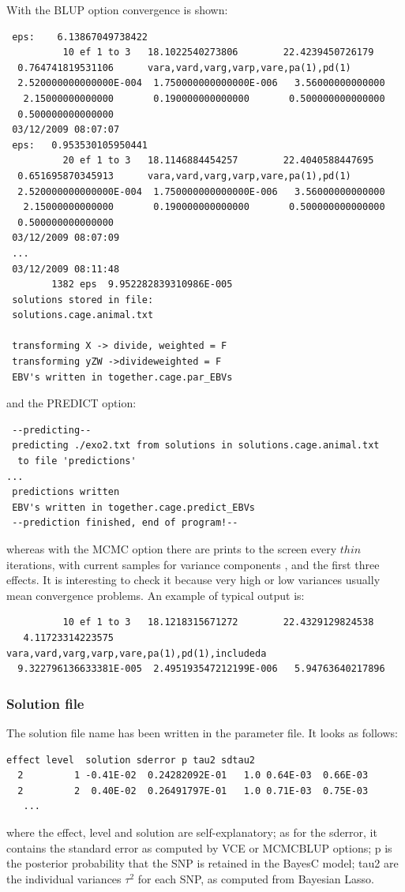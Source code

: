 \documentclass[a4paper,12pt,titlepage]{article}      %
\begin{document}
With the BLUP option convergence is shown:
{\scriptsize
\begin{verbatim}
 eps:    6.13867049738422
          10 ef 1 to 3   18.1022540273806        22.4239450726179
  0.764741819531106      vara,vard,varg,varp,vare,pa(1),pd(1)
  2.520000000000000E-004  1.750000000000000E-006   3.56000000000000
   2.15000000000000       0.190000000000000       0.500000000000000
  0.500000000000000
 03/12/2009 08:07:07
 eps:   0.953530105950441
          20 ef 1 to 3   18.1146884454257        22.4040588447695
  0.651695870345913      vara,vard,varg,varp,vare,pa(1),pd(1)
  2.520000000000000E-004  1.750000000000000E-006   3.56000000000000
   2.15000000000000       0.190000000000000       0.500000000000000
  0.500000000000000
 03/12/2009 08:07:09
 ...
 03/12/2009 08:11:48
        1382 eps  9.952282839310986E-005
 solutions stored in file:
 solutions.cage.animal.txt

 transforming X -> divide, weighted = F
 transforming yZW ->divideweighted = F
 EBV's written in together.cage.par_EBVs
\end{verbatim}
}
and the PREDICT option:
{\scriptsize
\begin{verbatim}
 --predicting--
 predicting ./exo2.txt from solutions in solutions.cage.animal.txt
  to file 'predictions'
...
 predictions written
 EBV's written in together.cage.predict_EBVs
 --prediction finished, end of program!--
\end{verbatim}
}

whereas with the MCMC option there are prints to the screen every $thin$ iterations, with current samples for variance components , and the first three effects. It is interesting to check it because very high or low variances usually mean convergence problems. An example of typical output is:
{\scriptsize
\begin{verbatim}
          10 ef 1 to 3   18.1218315671272        22.4329129824538
   4.11723314223575      vara,vard,varg,varp,vare,pa(1),pd(1),includeda
  9.322796136633381E-005  2.495193547212199E-006   5.94763640217896
\end{verbatim}
}

\subsubsection{Solution file}
The solution file name has been written in the parameter file. It looks as follows:
{\scriptsize
\begin{verbatim}
effect level  solution sderror p tau2 sdtau2
  2         1 -0.41E-02  0.24282092E-01   1.0 0.64E-03  0.66E-03
  2         2  0.40E-02  0.26491797E-01   1.0 0.71E-03  0.75E-03
   ...
 \end{verbatim}
}
where the effect, level and solution are self-explanatory; as for the sderror, it contains the standard error as computed by VCE or MCMCBLUP options; p is the posterior probability that the SNP is retained in the BayesC model; tau2 are the individual variances $\tau^2$ for each SNP, as computed from Bayesian Lasso.
\end{document}
